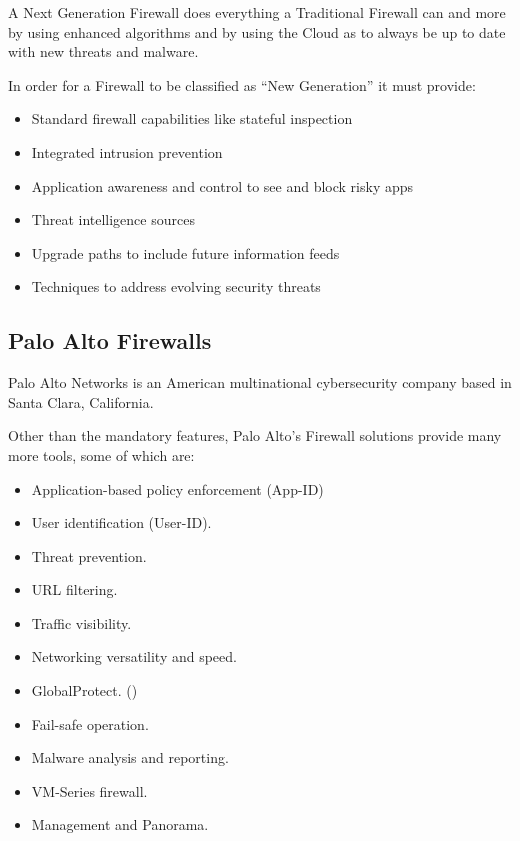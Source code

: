 \newpage

A Next Generation Firewall does everything a Traditional Firewall can and more by using  enhanced algorithms  and by using the Cloud as to always be up to date with new threats and malware.

In order for a Firewall to be classified as ``New Generation'' it must provide\cite{ngfw-cisco}:

\begin{itemize}
 \item Standard firewall capabilities like stateful inspection
 \item Integrated intrusion prevention
 \item Application awareness and control to see and block risky apps
 \item Threat intelligence sources
 \item Upgrade paths to include future information feeds
 \item Techniques to address evolving security threats
\end{itemize}

\newpage

\subsection{Palo Alto Firewalls}

Palo Alto Networks is an American multinational cybersecurity company based in Santa Clara, California.

Other than the mandatory  features, Palo Alto's Firewall solutions provide many more tools, some of which are\cite{panos-features}:

\begin{itemize}
    \item Application-based policy enforcement (App-ID)
    \item User identification (User-ID).
    \item Threat prevention.
    \item URL filtering.
    \item Traffic visibility.
    \item Networking versatility and speed.
    \item GlobalProtect. ()
    \item Fail-safe operation.
    \item Malware analysis and reporting.
    \item VM-Series firewall.
    \item Management and Panorama.
\end{itemize}

